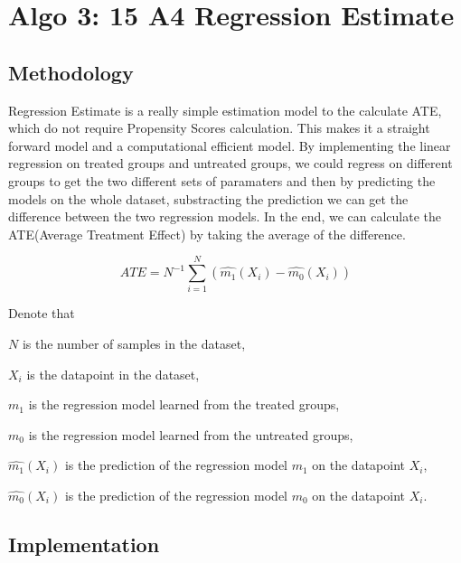 \documentclass[]{article}
\begin{document}
\hypertarget{algo-3-15-a4-regression-estimate}{%
\section{Algo 3: 15 A4 Regression
Estimate}\label{algo-3-15-a4-regression-estimate}}

\hypertarget{methodology}{%
\subsection{Methodology}\label{methodology}}

Regression Estimate is a really simple estimation model to the calculate
ATE, which do not require Propensity Scores calculation. This makes it a
straight forward model and a computational efficient model. By
implementing the linear regression on treated groups and untreated
groups, we could regress on different groups to get the two different
sets of paramaters and then by predicting the models on the whole
dataset, substracting the prediction we can get the difference between
the two regression models. In the end, we can calculate the ATE(Average
Treatment Effect) by taking the average of the difference.

\[ ATE = N^{-1} \sum^N_{i=1}(\hat {m_1}(X_i)-\hat {m_0}(X_i))\]

Denote that

\(N\) is the number of samples in the dataset,

\(X_i\) is the datapoint in the dataset,

\(m_1\) is the regression model learned from the treated groups,

\(m_0\) is the regression model learned from the untreated groups,

\(\hat {m_1}(X_i)\) is the prediction of the regression model \(m_1\) on
the datapoint \(X_i\),

\(\hat {m_0}(X_i)\) is the prediction of the regression model \(m_0\) on
the datapoint \(X_i\).

\hypertarget{implementation}{%
\subsection{Implementation}\label{implementation}}
\end{document}
